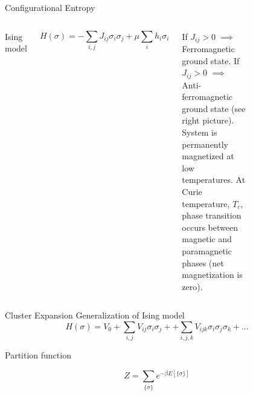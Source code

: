 \documentclass[aspectratio=169]{beamer}
\begin{document}
    \begin{frame}{Configurational Entropy}

        \begin{columns}
            Ising model

            \begin{equation*}
                H(\sigma) = -\sum_{i,j} J_{ij} \sigma_i \sigma_j + \mu \sum_i h_i \sigma_i
            \end{equation*}

            If $J_{ij} > 0$ $\implies$ Ferromagnetic ground state.\newline
            \newline
            If $J_{ij} > 0$ $\implies$ Anti-ferromagnetic ground state (see right picture).\newline
            \newline
            System is permanently magnetized at low temperatures.\newline
            \newline
            At Curie temperature, $T_c$, phase transition occurs between magnetic and paramagnetic phases (net magnetization is zero).

            \begin{figure}
            \end{figure}

        \end{columns}
    \end{frame}


    \begin{frame}{Cluster Expansion}
        Generalization of Ising model
        \begin{equation*}
            H(\sigma) = V_0 + \sum_{i,j} V_{ij} \sigma_i \sigma_j + + \sum_{i,j,k} V_{ijk} \sigma_i \sigma_j \sigma_k + ...
        \end{equation*}

        Partition function

        \begin{equation*}
            Z = \sum_{\{\sigma\}} e^{-\beta E[\{\sigma\}]}
        \end{equation*}

    \end{frame}
\end{document}
